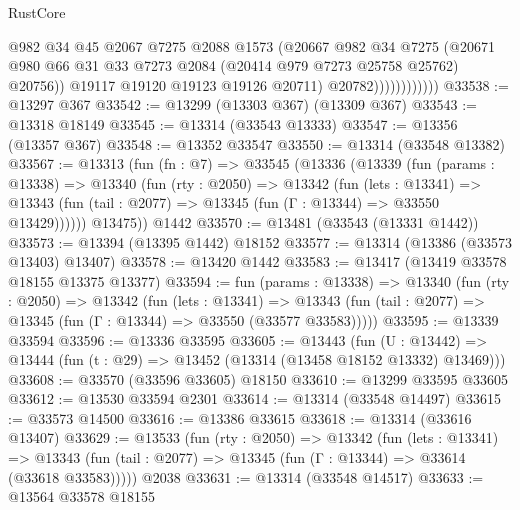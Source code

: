 \begin{lexlean}{RustCore}
\begin{coremodule}
                              @982
                              @34
                              @45
                              @2067
                              @7275
                              @2088
                              @1573
                              (@20667
                                @982
                                @34
                                @7275
                                (@20671
                                  @980
                                  @66
                                  @31
                                  @33
                                  @7273
                                  @2084
                                  (@20414 @979 @7273 @25758 @25762)
                                  @20756))
                              @19117
                              @19120
                              @19123
                              @19126
                              @20711)
                            @20782))))))))))))
@33538 := @13297 @367
@33542 := @13299 (@13303 @367) (@13309 @367)
@33543 := @13318 @18149
@33545 := @13314 (@33543 @13333)
@33547 := @13356 (@13357 @367)
@33548 := @13352 @33547
@33550 := @13314 (@33548 @13382)
@33567 := @13313
    (fun (fn : @7) =>
    @33545
      (@13336
        (@13339
          (fun (params : @13338) =>
          @13340
            (fun (rty : @2050) =>
            @13342
              (fun (lets : @13341) =>
              @13343 (fun (tail : @2077) => @13345 (fun (Γ : @13344) => @33550 @13429))))))
        @13475))
    @1442
@33570 := @13481 (@33543 (@13331 @1442))
@33573 := @13394 (@13395 @1442) @18152
@33577 := @13314 (@13386 (@33573 @13403) @13407)
@33578 := @13420 @1442
@33583 := @13417 (@13419 @33578 @18155 @13375 @13377)
@33594 := fun (params : @13338) =>
  @13340
    (fun (rty : @2050) =>
    @13342
      (fun (lets : @13341) =>
      @13343 (fun (tail : @2077) => @13345 (fun (Γ : @13344) => @33550 (@33577 @33583)))))
@33595 := @13339 @33594
@33596 := @13336 @33595
@33605 := @13443
    (fun (U : @13442) => @13444 (fun (t : @29) => @13452 (@13314 (@13458 @18152 @13332) @13469)))
@33608 := @33570 (@33596 @33605) @18150
@33610 := @13299 @33595 @33605
@33612 := @13530 @33594 @2301
@33614 := @13314 (@33548 @14497)
@33615 := @33573 @14500
@33616 := @13386 @33615
@33618 := @13314 (@33616 @13407)
@33629 := @13533
    (fun (rty : @2050) =>
    @13342
      (fun (lets : @13341) =>
      @13343 (fun (tail : @2077) => @13345 (fun (Γ : @13344) => @33614 (@33618 @33583)))))
    @2038
@33631 := @13314 (@33548 @14517)
@33633 := @13564 @33578 @18155

\end{coremodule}
\end{lexlean}
